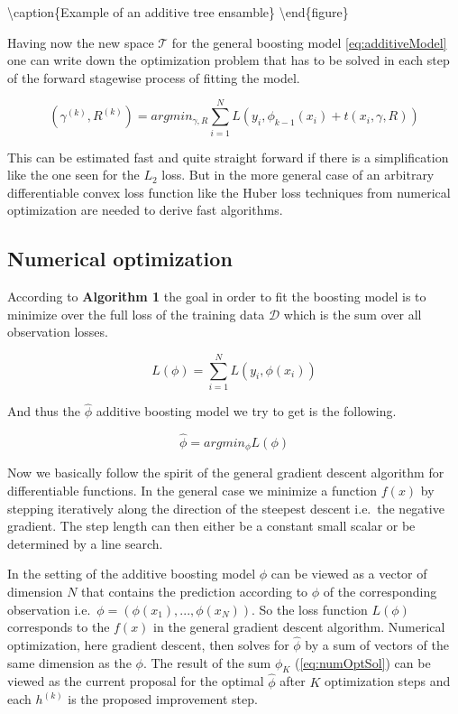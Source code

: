 \documentclass[
]{book}
\begin{document}
\textbackslash caption\{Example of an additive tree ensamble\citep{xgboost_paper}\}\label{fig:exampleAdditiveTree}
\textbackslash end\{figure\}

Having now the new space \(\mathcal{T}\) for the general boosting model \eqref{eq:additiveModel} one can write down the optimization problem that has to be solved in each step of the forward stagewise process of fitting the model.

\begin{equation}
  (\gamma^{(k)},R^{(k)}) = argmin_{\gamma,R} \sum_{i=1}^N L(y_i, \phi_{k-1}(x_i) + t(x_i,\gamma,R))
  \label{eq:oneStepTreeBoost}
\end{equation}

This can be estimated fast and quite straight forward if there is a simplification like the one seen for the \(L_2\) loss. But in the more general case of an arbitrary differentiable convex loss function like the Huber loss techniques from numerical optimization are needed to derive fast algorithms.\citep{elements}

\hypertarget{numerical-optimization}{%
\subsection{Numerical optimization}\label{numerical-optimization}}

According to \textbf{Algorithm 1} the goal in order to fit the boosting model is to minimize over the full loss of the training data \(\mathcal{D}\) which is the sum over all observation losses.

\[
L(\phi) = \sum_{i=1}^N L(y_i, \phi(x_i))
\]

And thus the \(\hat{\phi}\) additive boosting model we try to get is the following.

\[
\hat{\phi} = argmin_{\phi} L(\phi)
\]

Now we basically follow the spirit of the general gradient descent algorithm for differentiable functions. In the general case we minimize a function \(f(x)\) by stepping iteratively along the direction of the steepest descent i.e.~the negative gradient. The step length can then either be a constant small scalar or be determined by a line search.

In the setting of the additive boosting model \(\phi\) can be viewed as a vector of dimension \(N\) that contains the prediction according to \(\phi\) of the corresponding observation i.e.~\(\phi = (\phi(x_1),...,\phi(x_N))\). So the loss function \(L(\phi)\) corresponds to the \(f(x)\) in the general gradient descent algorithm. Numerical optimization, here gradient descent, then solves for \(\hat{\phi}\) by a sum of vectors of the same dimension as the \(\phi\).\citep{elements} The result of the sum \(\phi_K\) (\eqref{eq:numOptSol}) can be viewed as the current proposal for the optimal \(\hat{\phi}\) after \(K\) optimization steps and each \(h^{(k)}\) is the proposed improvement step.
\end{document}
